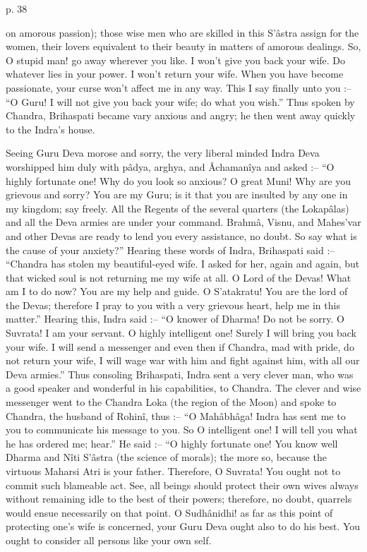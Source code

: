  

p. 38

 

on amorous passion); those wise men who are skilled in this S'âstra assign for the women, their lovers equivalent to their beauty in matters of amorous dealings. So, O stupid man! go away wherever you like. I won't give you back your wife. Do whatever lies in your power. I won't return your wife. When you have become passionate, your curse won't affect me in any way. This I say finally unto you :-- “O Guru! I will not give you back your wife; do what you wish.” Thus spoken by Chandra, Brihaspati became vary anxious and angry; he then went away quickly to the Indra's house.

 

Seeing Guru Deva morose and sorry, the very liberal minded Indra Deva worshipped him duly with pâdya, arghya, and Âchamanîya and asked :-- “O highly fortunate one! Why do you look so anxious? O great Muni! Why are you grievous and sorry? You are my Guru; is it that you are insulted by any one in my kingdom; say freely. All the Regents of the several quarters (the Lokapâlas) and all the Deva armies are under your command. Brahmâ, Visnu, and Mahes'var and other Devas are ready to lend you every assistance, no doubt. So say what is the cause of your anxiety?” Hearing these words of Indra, Brihaspati said :-- “Chandra has stolen my beautiful-eyed wife. I asked for her, again and again, but that wicked soul is not returning me my wife at all. O Lord of the Devas! What am I to do now? You are my help and guide. O S'atakratu! You are the lord of the Devas; therefore I pray to you with a very grievous heart, help me in this matter.” Hearing this, Indra said :-- “O knower of Dharma! Do not be sorry. O Suvrata! I am your servant. O highly intelligent one! Surely I will bring you back your wife. I will send a messenger and even then if Chandra, mad with pride, do not return your wife, I will wage war with him and fight against him, with all our Deva armies.” Thus consoling Brihaspati, Indra sent a very clever man, who was a good speaker and wonderful in his capabilities, to Chandra. The clever and wise messenger went to the Chandra Loka (the region of the Moon) and spoke to Chandra, the husband of Rohinî, thus :-- “O Mahâbhâga! Indra has sent me to you to communicate his message to you. So O intelligent one! I will tell you what he has ordered me; hear.” He said :-- “O highly fortunate one! You know well Dharma and Nîti S'âstra (the science of morals); the more so, because the virtuous Maharsi Atri is your father. Therefore, O Suvrata! You ought not to commit such blameable act. See, all beings should protect their own wives always without remaining idle to the best of their powers; therefore, no doubt, quarrels would ensue necessarily on that point. O Sudhânidhi! as far as this point of protecting one's wife is concerned, your Guru Deva ought also to do his best. You ought to consider all persons like your own self.

